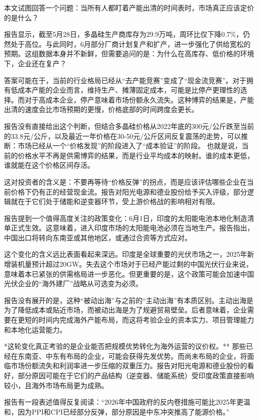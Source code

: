 \documentclass[11pt]{ctexart}
\begin{document}
本文试图回答一个问题：当所有人都盯着产能出清的时间表时，市场真正应该定价的是什么？

报告显示，截至5月28日，多晶硅生产商库存为29.9万吨，周环比仅下降0.7\%，仍然处于高位。与此同时，6月部分厂商计划复产和扩产，进一步强化了供给宽松的预期。这组数据本身并不新鲜，但需要追问的是：为什么在高库存、低价格的环境下，企业还在复产？

答案可能在于，当前的行业格局已经从“去产能竞赛”变成了“现金流竞赛”。对于拥有低成本产能的企业而言，维持生产、摊薄固定成本，可能是比停产更理性的选择。而对于高成本企业，停产意味着市场份额永久流失。这种博弈的结果是，产能出清的速度会比市场预期的更慢，价格底部的时间跨度会更长。

报告没有直接给出这个判断，但结合多晶硅价格从2022年底的300元/公斤跌至当前的33.8元/公斤，以及最近一年价格在30-50元/公斤区间反复震荡的走势，可以推断：市场已经从一个“价格发现”的阶段进入了“成本验证”的阶段。 也就是说，当前的价格水平不再是供需博弈的结果，而是行业平均成本的映射。谁的成本更低，谁就能在这个价格区间存活。

这对投资者的含义是：不要再等待“价格反弹”的拐点，而是应该评估哪些企业在当前价格下仍有正的经营现金流。报告对阳光电源和德业股份给予买入评级，部分逻辑就在于它们处于储能和逆变器环节，受上游价格战的影响相对有限。

报告提到一个值得高度关注的政策变化：6月1日，印度的太阳能电池本地化制造清单正式生效。这意味着，进入印度市场的太阳能电池必须在当地生产。报告指出，中国出口将转向东南亚或其他地区，或通过合资等方式应对。

这个变化的含义远比表面看起来深远。印度是全球重要的光伏市场之一，2025年新增装机量预计超过20GW。失去这个市场对于已经产能过剩的中国光伏行业来说，意味着本已紧张的供需格局进一步恶化。但更重要的是，这个政策可能会加速中国光伏企业的“海外建厂”战略从可选变为必须。

报告没有展开的是，这种“被动出海”与之前的“主动出海”有本质区别。主动出海是为了降低成本或贴近市场，而被动出海是为了规避贸易壁垒。后者意味着，企业需要在更短的时间内完成海外产能布局，而这将考验企业的资本实力、项目管理能力和本地化运营能力。

*这轮变化真正考验的是企业能否把规模优势转化为海外运营的议价权。** 那些已经在东南亚、中东有布局的企业，可能会获得先发优势。而尚未布局的企业，将面临市场份额流失和利润率进一步压缩的双重压力。报告对阳光电源和德业股份的看好，部分原因可能在于它们的产品结构（逆变器、储能系统）受印度政策直接影响较小，且海外市场布局更为成熟。

报告有一段表述值得反复阅读：“2026年中国政府的反内卷措施可能比2025年更温和，因为PPI和CPI已经部分反弹，部分原因是中东冲突推高了能源价格。”
\end{document}

